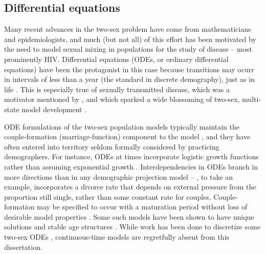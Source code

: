 \subsection{Differential equations} 
Many recent advances in the two-sex problem
have come from mathematicians and epidemiologists, and much (but not all) of
this effort has been motivated by the need to model sexual mixing in
populations for the study of disease -- most prominently HIV. Differential
equations (ODEs, or ordinary differential equations) have been the protagonist
in this case because transitions may ocurr in intervals of less than a year 
(the standard in discrete demography), just as in
life \citep{hoppensteadt1975mathematical}. This is especially true of sexually
transmitted disease, which was a motivator mentioned by \citet{hadeler1988models}, and which sparked a wide blossoming
of two-sex, multi-state model development
\citep{dietz1988epidemiological,hadeler1989pair,busenberg1991general,blythe1991toward}.

ODE formulations of the two-sex population models typically maintain the
couple-formation (marriage-function) component to the model
\citep{Fredrickson1971,inaba1992age} 
\citep[see e.g.,][for a good overview]{ianelli2005gender}, and they have often
entered into territory seldom formally considered by practicing demographers. For instance,
ODEs at times incorporate logistic growth
functions \citep{castillo1995logistic,yang2009logisticwb,yang2009logistic}
rather than assuming exponential growth \citep{martcheva1999exponential}.
Interdependencies in ODEs branch in more directions than in any demographic
projection model -- \citet{maxin2010two}, to take an example, incorporates a 
divorce rate that depends on external pressure from the proportion still single,
rather than some constant rate for couples. Couple-formation may be
specified to occur with a maturation period without
loss of desirable model properties \citep{hadeler1993pair}. Some such models
have been shown to have unique solutions \citep{martcheva1999two} and stable age
structures \citep{inaba2000persistent}. While work has been done to
discretize some two-sex ODEs \citep{arbogast1989finite,
martcheva2001mathematics, ianelli2005gender}, continuous-time models are
regretfully absent from this dissertation.

